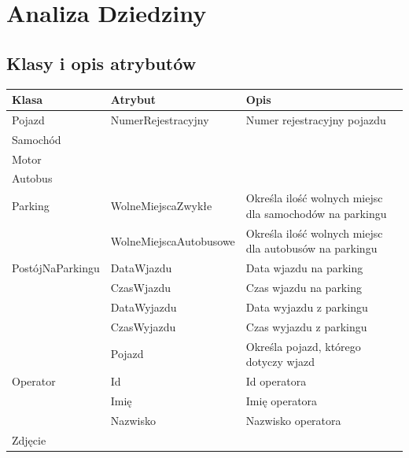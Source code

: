 \chapter{Analiza Dziedziny}
\label{cha:anDziedziny}

\section{Klasy i opis atrybutów}
\label{sec:klasyAtrybuty}
\begin{table}[H]
	\begin{tabular}{|l|l|l|} \hline
	\textbf{Klasa}	& \textbf{Atrybut} & \textbf{Opis} \\ \hline%
	Pojazd	& NumerRejestracyjny & Numer rejestracyjny pojazdu \\ \hline
	Samochód& & \\ \hline
	Motor& &  \\ \hline
	Autobus& & \\ \hline
	Parking	& WolneMiejscaZwykłe & Określa ilość wolnych miejsc dla samochodów na parkingu \\
	& WolneMiejscaAutobusowe & Określa ilość wolnych miejsc dla autobusów na parkingu \\ \hline
	PostójNaParkingu & DataWjazdu & Data wjazdu na parking\\
	& CzasWjazdu & Czas wjazdu na parking \\
	& DataWyjazdu & Data wyjazdu z parkingu\\
	& CzasWyjazdu & Czas wyjazdu z parkingu \\
	& Pojazd & Określa pojazd, którego dotyczy wjazd \\ \hline
	Operator& Id & Id operatora \\
	& Imię & Imię operatora \\
	& Nazwisko & Nazwisko operatora \\ \hline
	Zdjęcie& &  \\ \hline
	\end{tabular}
\end{table}



